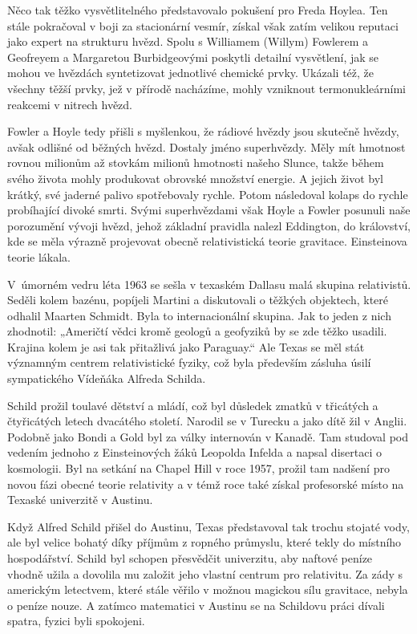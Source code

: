   Něco tak těžko vysvětlitelného představovalo pokušení pro Freda Hoylea. Ten stále pokračoval v
  boji za stacionární vesmír, získal však zatím velikou reputaci jako expert na strukturu hvězd.
  Spolu s Williamem (Willym) Fowlerem a Geofreyem a Margaretou Burbidgeovými poskytli detailní
  vysvětlení, jak se mohou ve hvězdách syntetizovat jednotlivé chemické prvky. Ukázali též, že
  všechny těžší prvky, jež v přírodě nacházíme, mohly vzniknout termonukleárními reakcemi v nitrech
  hvězd. 

  Fowler a Hoyle tedy přišli s myšlenkou, že rádiové hvězdy jsou skutečně hvězdy, avšak odlišné od
  běžných hvězd. Dostaly jméno superhvězdy. Měly mít hmotnost rovnou milionům až stovkám milionů
  hmotnosti našeho Slunce, takže během svého života mohly produkovat obrovské množství energie. A
  jejich život byl krátký, své jaderné palivo spotřebovaly rychle. Potom následoval kolaps do rychle
  probíhající divoké smrti. Svými superhvězdami však Hoyle a Fowler posunuli naše porozumění vývoji
  hvězd, jehož základní pravidla nalezl Eddington, do království, kde se měla výrazně projevovat
  obecně relativistická teorie gravitace. Einsteinova teorie lákala. 

  V úmorném vedru léta 1963 se sešla v texaském Dallasu malá skupina relativistů. Seděli kolem
  bazénu, popíjeli Martini a diskutovali o těžkých objektech, které odhalil Maarten Schmidt. Byla to
  internacionální skupina. Jak to jeden z nich zhodnotil: „Američtí vědci kromě geologů a geofyziků
  by se zde těžko usadili. Krajina kolem je asi tak přitažlivá jako Paraguay.“ Ale Texas se měl stát
  významným centrem relativistické fyziky, což byla především zásluha úsilí sympatického Vídeňáka
  Alfreda Schilda. 

  Schild prožil toulavé dětství a mládí, což byl důsledek zmatků v třicátých a čtyřicátých letech
  dvacátého století. Narodil se v Turecku a jako dítě žil v Anglii. Podobně jako Bondi a Gold byl za
  války internován v Kanadě. Tam studoval pod vedením jednoho z Einsteinových žáků Leopolda Infelda
  a napsal disertaci o kosmologii. Byl na setkání na Chapel Hill v roce 1957, prožil tam nadšení pro
  novou fázi obecné teorie relativity a v témž roce také získal profesorské místo na Texaské
  univerzitě v Austinu. 

  Když Alfred Schild přišel do Austinu, Texas představoval tak trochu stojaté vody, ale byl velice
  bohatý díky příjmům z ropného průmyslu, které tekly do místního hospodářství. Schild byl schopen
  přesvědčit univerzitu, aby naftové peníze vhodně užila a dovolila mu založit jeho vlastní centrum
  pro relativitu. Za zády s americkým letectvem, které stále věřilo v možnou magickou sílu
  gravitace, nebyla o peníze nouze. A zatímco matematici v Austinu se na Schildovu práci dívali
  spatra, fyzici byli spokojeni. 

